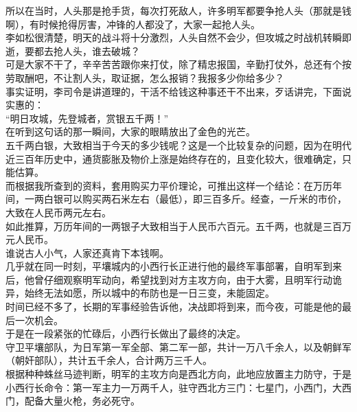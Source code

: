 \begin{multicols}{\theparacolNo}
所以在当时，人头那是抢手货，每次打死敌人，许多明军都要争抢人头（那就是钱啊），有时候抢得厉害，冲锋的人都没了，大家一起抢人头。\\

李如松很清楚，明天的战斗将十分激烈，人头自然不会少，但攻城之时战机转瞬即逝，要都去抢人头，谁去破城？\\

可是大家不干了，辛辛苦苦跟你来打仗，除了精忠报国，辛勤打仗外，总还有个按劳取酬吧，不让割人头，取证据，怎么报销？我报多少你给多少？\\

事实证明，李司令是讲道理的，干活不给钱这种事还干不出来，歹话讲完，下面说实惠的：\\

“明日攻城，先登城者，赏银五千两！”\\

在听到这句话的那一瞬间，大家的眼睛放出了金色的光芒。\\

五千两白银，大致相当于今天的多少钱呢？这是一个比较复杂的问题，因为在明代近三百年历史中，通货膨胀及物价上涨是始终存在的，且变化较大，很难确定，只能估算。\\

而根据我所查到的资料，套用购买力平价理论，可推出这样一个结论：在万历年间，一两白银可以购买两石米左右（最低），即三百多斤。经查，一斤米的市价，大致在人民币两元左右。\\

如此推算，万历年间的一两银子大致相当于人民币六百元。五千两，也就是三百万元人民币。\\

谁说古人小气，人家还真肯下本钱啊。\\

几乎就在同一时刻，平壤城内的小西行长正进行他的最终军事部署，自明军到来后，他曾仔细观察明军动向，希望找到对方主攻方向，由于大雾，且明军行动诡异，始终无法如愿，所以城中的布防也是一日三变，未能固定。\\

时间已经不多了，长期的军事经验告诉他，决战即将到来，而今夜，可能是他的最后一次机会。\\

于是在一段紧张的忙碌后，小西行长做出了最终的决定。\\

守卫平壤部队，为日军第一军全部、第二军一部，共计一万八千余人，以及朝鲜军（朝奸部队），共计五千余人，合计两万三千人。\\

根据种种蛛丝马迹判断，明军的主攻方向是西北方向，此地应放置主力防守，于是小西行长命令：第一军主力一万两千人，驻守西北方三门：七星门，小西门，大西门，配备大量火枪，务必死守。\\


\end{multicols}
